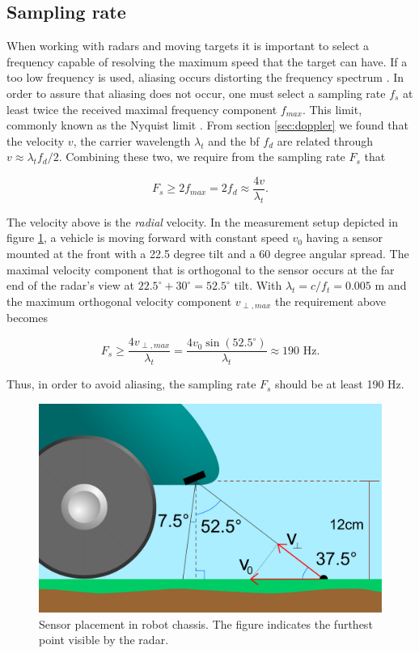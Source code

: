 \subsection{Sampling rate}
When working with radars and moving targets it is important to select a frequency capable of resolving the maximum speed that the target can have. If a too low frequency is used, aliasing occurs distorting the frequency spectrum \citep{lindgren_rootzeŽn_sandsten_2013}. In order to assure that aliasing does not occur, one must select a sampling rate $f_s$ at least twice the received maximal frequency component $f_{max}$. This limit, commonly known as the Nyquist limit \citep{proakis_manolakis_1995}. From section \ref{sec:doppler} we found that the velocity $v$, the carrier wavelength $\lambda_t$ and the \gls{bf} $f_d$ are related through $v \approx \lambda_tf_d/2$. Combining these two, we require from the sampling rate $F_s$ that 

\begin{equation}
\label{eq:nyquist}
		F_{s} \geq 2f_{max} 
		= 2f_d 
		\approx \frac{4v}{\lambda_t}.
\end{equation}

The velocity above is the \emph{radial} velocity. In the measurement setup depicted in figure \ref{fig:sensor_placement}, a vehicle is moving forward with constant speed $v_0$ having a sensor mounted at the front with a 22.5 degree tilt and a 60 degree angular spread. The maximal velocity component that is orthogonal to the sensor occurs at the far end of the radar's view at $22.5^\circ + 30^\circ = 52.5^\circ$ tilt. With $\lambda_t=c/f_t=0.005$ m and the maximum orthogonal velocity component $v_{\perp, max}$ the requirement above becomes

\begin{equation}
	F_s \geq 
	\frac{4v_{\perp, max}}{\lambda_t}
	= \frac{4v_0\sin(52.5^\circ)}{\lambda_t} 
	\approx 190 \text{ Hz}.
\end{equation}

Thus, in order to avoid aliasing, the sampling rate $F_s$ should be at least 190 Hz. 


\begin{figure}[h]
	\centering
	\includegraphics[scale=0.30]{figs_temp/sensor_placement.jpg}
	\caption{Sensor placement in robot chassis. The figure indicates the furthest point visible by the radar.}
	\label{fig:sensor_placement}
\end{figure}
